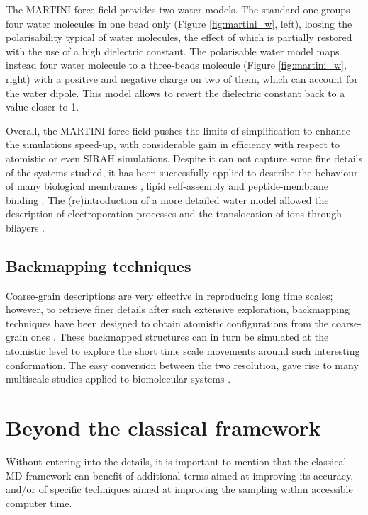 The MARTINI force field provides two water models. The standard one groups four water molecules in one bead only (Figure \ref{fig:martini_w}, left), loosing the polarisability typical of water molecules, the effect of which is partially restored with the use of a high dielectric constant. The polarisable water model \cite{Yesylevskyy2010} maps instead four water molecule to a three-beads molecule (Figure \ref{fig:martini_w}, right) with a positive and negative charge on two of them, which can account for the water dipole. This model allows to revert the dielectric constant back to a value closer to 1.

Overall, the MARTINI force field pushes the limits of simplification to enhance the simulations speed-up, with considerable gain in efficiency with respect to atomistic or even SIRAH simulations. Despite it can not capture some fine details of the systems studied, it has been successfully applied to describe the behaviour of many biological membranes \cite{Khalid2019,Samsudin2017}, lipid self-assembly \cite{Marrink2007} and peptide-membrane binding \cite{Song2019}. The (re)introduction of a more detailed water model allowed the description of electroporation processes and the translocation of ions through bilayers \cite{Yesylevskyy2010}.

\subsection{Backmapping techniques} Coarse-grain descriptions are very effective in reproducing long time scales; however, to retrieve finer details after such extensive exploration, backmapping techniques have been designed to obtain atomistic configurations from the coarse-grain ones \cite{Wassenaar2015}. These backmapped structures can in turn be simulated at the atomistic level to explore the short time scale movements around such interesting conformation. The easy conversion between the two resolution, gave rise to many multiscale studies applied to biomolecular systems \cite{Lee2012}.


\section{Beyond the classical framework}

Without entering into the details, it is important to mention that the classical MD framework can benefit of additional terms aimed at improving its accuracy, and/or of specific techniques aimed at improving the
 sampling within accessible computer time.
 
